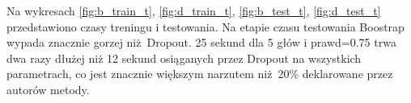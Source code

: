 \begin{figure}[H]
	\begin{floatrow}
	\end{floatrow}
\end{figure}

Na wykresach \ref{fig:b_train_t}, \ref{fig:d_train_t}, \ref{fig:b_test_t}, \ref{fig:d_test_t} przedstawiono czasy treningu i testowania. Na etapie czasu testowania Boostrap wypada znacznie gorzej niż Dropout. 25 sekund dla 5 głów i prawd=0.75 trwa dwa razy dłużej niż 12 sekund osiąganych przez Dropout na wszystkich parametrach, co jest znacznie większym narzutem niż 20\% deklarowane przez autorów metody.

